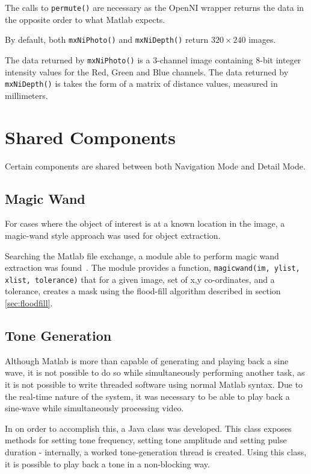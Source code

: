 The calls to \texttt{permute()} are necessary as the OpenNI wrapper returns the data in the opposite order to what Matlab expects.

By default, both \texttt{mxNiPhoto()} and \texttt{mxNiDepth()} return $320\times240$ images.

The data returned by \texttt{mxNiPhoto()} is a 3-channel image containing 8-bit integer intensity values for the Red, Green and Blue channels.
The data returned by \texttt{mxNiDepth()} is takes the form of a matrix of distance values, measured in millimeters.


\section{Shared Components}
\label{sec:sharedcomponents}
Certain components are shared between both Navigation Mode and Detail Mode.
\subsection{Magic Wand}
\label{sec:magicwand}
For cases where the object of interest is at a known location in the image, a magic-wand style approach was used for object extraction. 

Searching the Matlab file exchange, a module able to perform magic wand extraction was found~\cite{magicwandmatlab}. The module provides a function, \texttt{magicwand(im, ylist, xlist, tolerance)} that for a given image, set of {x,y} co-ordinates, and a tolerance, creates a mask using the flood-fill algorithm described in section \ref{sec:floodfill}.

\subsection{Tone Generation}
\label{sec:tonegen}
Although Matlab is more than capable of generating and playing back a sine wave, it is not possible to do so while simultaneously performing another task, as it is not possible to write threaded software using normal Matlab syntax. Due to the real-time nature of the system, it was necessary to be able to play back a sine-wave while simultaneously processing video.

In on order to accomplish this, a Java class was developed. This class exposes methods for setting tone frequency, setting tone amplitude and setting pulse duration - internally, a worked tone-generation thread is created. Using this class, it is possible to play back a tone in a non-blocking way. 

